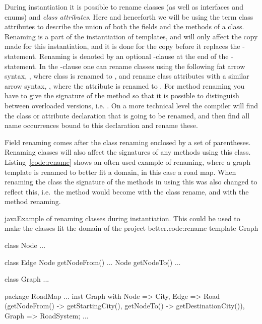 During instantiation it is possible to rename classes (as well as interfaces and enums) and \textit{class attributes}.
Here and henceforth we will be using the term class attributes to describe the union of both the fields and the methods of a class.
Renaming is a part of the instantiation of templates, and will only affect the copy made for this instantiation, and it is done for the copy before it replaces the -statement.
Renaming is denoted by an optional -clause at the end of the -statement.
In the -clause one can rename classes using the following fat arrow syntax, , where class  is renamed to , and rename class attributes with a similar arrow syntax, , where the attribute  is renamed to .
For method renaming you have to give the signature of the method so that it is possible to distinguish between overloaded versions, i.e. .
On a more technical level the compiler will find the class or attribute declaration that is going to be renamed, and then find all name occurrences bound to this declaration and rename these.

Field renaming comes after the class renaming enclosed by a set of parentheses.
Renaming classes will also affect the signatures of any methods using this class.
Listing~\vref{code:rename} shows an often used example of renaming, where a graph template is renamed to better fit a domain, in this case a road map.
When renaming the class  the signature of the methods in  using this  was also changed to reflect this, i.e.\ the method  would become  with the class rename, and  with the method renaming.

\begin{code}{java}{Example of renaming classes during instantiation. This could be used to make the classes fit the domain of the project better.}{code:rename}
template Graph {
    class Node {
        ...
    }

    class Edge {
        Node getNodeFrom() { ... }
        Node getNodeTo() { ... }
    }

    class Graph {
        ...
    }
}

package RoadMap {
    ...
    inst Graph with
        Node => City,
        Edge => Road
            (getNodeFrom() -> getStartingCity(),
            getNodeTo() -> getDestinationCity()),
        Graph => RoadSystem;
    ...
}

\end{code}

